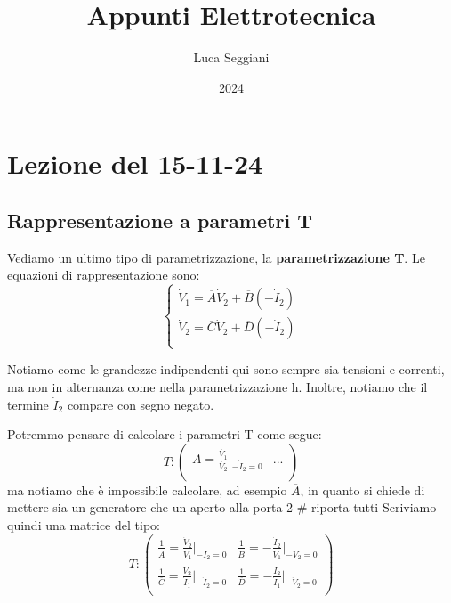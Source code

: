 \documentclass[a4paper,11pt]{article}
\title{Appunti Elettrotecnica}
\author{Luca Seggiani}
\date{2024}
\begin{document}
\section{Lezione del 15-11-24}

\thispagestyle{empty}
\pagestyle{fancy}

\subsection{Rappresentazione a parametri T}
Vediamo un ultimo tipo di parametrizzazione, la \textbf{parametrizzazione T}.
Le equazioni di rappresentazione sono:
\[
	\begin{cases}
		\dot{V}_1	= \overline{A} \dot{V}_2 + \overline{B} ( - \dot{I}_2 ) \\ 
		\dot{V}_2	= \overline{C} \dot{V}_2 + \overline{D} ( - \dot{I}_2 ) \\ 
	\end{cases}
\]

Notiamo come le grandezze indipendenti qui sono sempre sia tensioni e correnti, ma non in alternanza come nella parametrizzazione h.
Inoltre, notiamo che il termine $\dot{I}_2$ compare con segno negato.

Potremmo pensare di calcolare i parametri T come segue:
$$
T:
\begin{pmatrix}
	\overline{A} = \frac{\dot{V_1}}{\dot{V_2}} \Big|_{-\dot{I}_2 = 0}	& ... \\
\end{pmatrix}
$$
ma notiamo che è impossibile calcolare, ad esempio $\overline{A}$, in quanto si chiede di mettere sia un generatore che un aperto alla porta 2 # riporta tutti
Scriviamo quindi una matrice del tipo:
$$
T:
\begin{pmatrix}
	\frac{1}{\overline{A}} = \frac{\dot{V}_2}{\dot{V}_1} \Big|_{- \dot{I}_2 = 0} & \frac{1}{\overline{B}} = -\frac{\dot{I}_2}{\dot{V}_1} \Big|_{- \dot{V}_2 = 0} \\
	\frac{1}{\overline{C}} = \frac{\dot{V}_2}{\dot{I}_1} \Big|_{- \dot{I}_2 = 0} & \frac{1}{\overline{D}} = -\frac{\dot{I}_2}{\dot{I}_1} \Big|_{- \dot{V}_2 = 0} \\
\end{pmatrix}
$$
\end{document}
